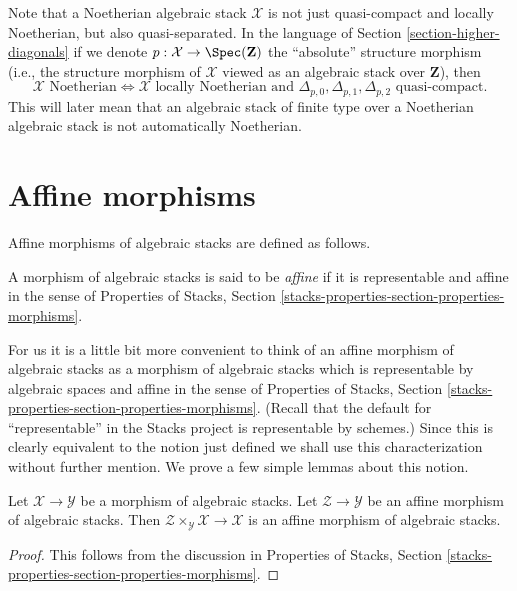\noindent
Note that a Noetherian algebraic stack $\mathcal{X}$ is not just quasi-compact
and locally Noetherian, but also quasi-separated. In the language of
Section \ref{section-higher-diagonals}
if we denote $p : \mathcal{X} \to \Spec(\mathbf{Z})$ the
``absolute'' structure morphism (i.e., the structure morphism of
$\mathcal{X}$ viewed as an algebraic stack over $\mathbf{Z}$), then
$$
\mathcal{X}\text{ Noetherian}
\Leftrightarrow
\mathcal{X}\text{ locally Noetherian and }
\Delta_{p, 0}, \Delta_{p, 1}, \Delta_{p, 2}
\text{ quasi-compact}.
$$
This will later mean that an algebraic stack of finite type over a
Noetherian algebraic stack is not automatically Noetherian.






\section{Affine morphisms}
\label{section-affine}

\noindent
Affine morphisms of algebraic stacks are defined as follows.

\begin{definition}
\label{definition-affine}
A morphism of algebraic stacks is said to be {\it affine}
if it is representable and affine in the sense of
Properties of Stacks, Section
\ref{stacks-properties-section-properties-morphisms}.
\end{definition}

\noindent
For us it is a little bit more convenient to think of an affine
morphism of algebraic stacks as a morphism of algebraic stacks which is
representable by algebraic spaces and affine in the sense of
Properties of Stacks, Section
\ref{stacks-properties-section-properties-morphisms}.
(Recall that the default for ``representable'' in the Stacks project
is representable by schemes.)
Since this is clearly equivalent to the notion just defined we shall
use this characterization without further mention.
We prove a few simple lemmas about this notion.

\begin{lemma}
\label{lemma-base-change-affine}
Let $\mathcal{X} \to \mathcal{Y}$ be a morphism of algebraic stacks.
Let $\mathcal{Z} \to \mathcal{Y}$ be an affine morphism of algebraic
stacks. Then $\mathcal{Z} \times_\mathcal{Y} \mathcal{X} \to \mathcal{X}$
is an affine morphism of algebraic stacks.
\end{lemma}

\begin{proof}
This follows from the discussion in
Properties of Stacks, Section
\ref{stacks-properties-section-properties-morphisms}.
\end{proof}

